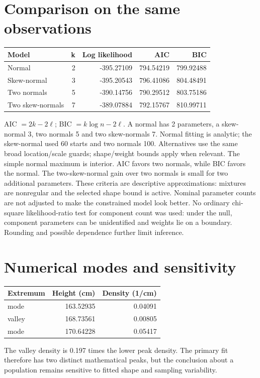 \documentclass[11pt,a4paper]{article}
\begin{document}
\section*{Comparison on the same observations}
\begin{center}
\small
\begin{tabular}{lrrrr}
\toprule
Model & k & Log likelihood & AIC & BIC\\
\midrule
Normal & 2 & -395.27109 & 794.54219 & 799.92488\\
Skew-normal & 3 & -395.20543 & 796.41086 & 804.48491\\
Two normals & 5 & -390.14756 & 790.29512 & 803.75186\\
Two skew-normals & 7 & -389.07884 & 792.15767 & 810.99711\\
\bottomrule
\end{tabular}
\end{center}
AIC $=2k-2\ell$; BIC $=k\log n-2\ell$. A normal has 2 parameters,
a skew-normal 3, two normals 5 and two skew-normals 7. Normal fitting is
analytic; the skew-normal used 60 starts and two normals 100. Alternatives use
the same broad location/scale guards; shape/weight bounds apply when relevant.
The simple normal maximum is interior. AIC favors two normals, while BIC
favors the normal. The two-skew-normal gain over two normals is small for
two additional parameters. These criteria are descriptive approximations:
mixtures are nonregular and the selected shape bound is active. Nominal
parameter counts are not adjusted to make the constrained model look better.
No ordinary chi-square likelihood-ratio test for component count was used:
under the null, component parameters can be unidentified and weights lie on
a boundary. Rounding and possible dependence further limit inference.

\clearpage\section*{Numerical modes and sensitivity}
\begin{center}
\small
\begin{tabular}{lrr}
\toprule
Extremum & Height (cm) & Density (1/cm)\\
\midrule
mode & 163.52935 & 0.04091\\
valley & 168.73561 & 0.00805\\
mode & 170.64228 & 0.05417\\
\bottomrule
\end{tabular}
\end{center}
The valley density is 0.197 times the lower peak density. The primary fit therefore has two distinct mathematical peaks, but the conclusion about a population remains sensitive to fitted shape and sampling variability.
\end{document}
